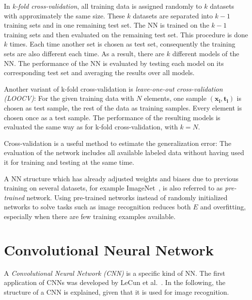 In \emph{k-fold cross-validation}, all training data is assigned randomly to $k$ datasets with approximately the same size. These $k$ datasets are separated into $k-1$ training sets and in one remaining test set. 
The NN is trained on the $k-1$ training sets and then evaluated on the remaining test set. This procedure is done $k$ times. Each time another set is chosen as test set, consequently the training sets are also different each time. As a result, there are $k$ different models of the NN. The performance of the NN is evaluated by testing each model on its corresponding test set and averaging the results over all models.

Another variant of k-fold cross-validation is \emph{leave-one-out cross-validation (LOOCV)}: 
For the given training data with $N$ elements, one sample $(\mathbf{x_l},\mathbf{t_l})$ is chosen as test sample, the rest of the data as training samples. Every element is chosen once as a test sample. The performance of the resulting models is evaluated the same way as for k-fold cross-validation, with $k=N$.

Cross-validation is a useful method to estimate the generalization error: The evaluation of the network includes all available labeled data without having used it for training and testing at the same time.~\cite{loocv_prev_overfit1997Ng} 

A NN structure which has already adjusted weights and biases due to previous training on several datasets, for example ImageNet~\cite{pre_trained_overfit2016marmanis}, is also referred to as \emph{pre-trained} network.
Using pre-trained networks instead of randomly initialized networks to solve tasks such as image recognition reduces both $E$
and overfitting, especially when there are few training examples available\cite{imageNetWinner2012krizhevsky, pre_trained_overfit2016marmanis}.

\section{Convolutional Neural Network}
\label{cnn:general}
A \emph{Convolutional Neural Network (CNN)} is a specific kind of NN. The first application of CNNs was developed by LeCun et al.~\cite{first_cnn1998lecun}. In the following, the structure of a CNN is explained, given that it is used for image recognition.

